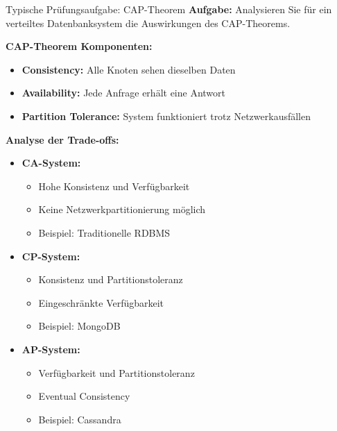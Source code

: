 \begin{example}{Typische Prüfungsaufgabe: CAP-Theorem}
\textbf{Aufgabe:}
Analysieren Sie für ein verteiltes Datenbanksystem die Auswirkungen des CAP-Theorems.

\textbf{CAP-Theorem Komponenten:}
\begin{itemize}
    \item \textbf{Consistency:} Alle Knoten sehen dieselben Daten
    \item \textbf{Availability:} Jede Anfrage erhält eine Antwort
    \item \textbf{Partition Tolerance:} System funktioniert trotz Netzwerkausfällen
\end{itemize}

\textbf{Analyse der Trade-offs:}
\begin{itemize}
    \item \textbf{CA-System:}
    \begin{itemize}
        \item Hohe Konsistenz und Verfügbarkeit
        \item Keine Netzwerkpartitionierung möglich
        \item Beispiel: Traditionelle RDBMS
    \end{itemize}
    \item \textbf{CP-System:}
    \begin{itemize}
        \item Konsistenz und Partitionstoleranz
        \item Eingeschränkte Verfügbarkeit
        \item Beispiel: MongoDB
    \end{itemize}
    \item \textbf{AP-System:}
    \begin{itemize}
        \item Verfügbarkeit und Partitionstoleranz
        \item Eventual Consistency
        \item Beispiel: Cassandra
    \end{itemize}
\end{itemize}
\end{example}

